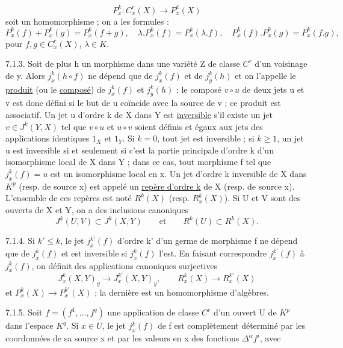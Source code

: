 \[
P_x^k:C_x^r(X)\longrightarrow P_x^k(X)
\]
soit un homomorphisme ; on a les formules :
\[
P_x^k(f)+P_x^k(g)=P_x^k(f+g),\quad
\lambda.P_x^k(f)=P_x^k(\lambda.f),\quad
P_x^k(f).P_x^k(g)=P_x^k(f.g),
\]
pour $f,g\in C_x^r(X)$, $\lambda\in K$.

7.1.3. Soit de plus h un morphisme dans une variété Z de classe $C^r$ d'un voisinage de y. Alors $j_x^k(h\circ f)$ ne dépend que de $j_x^k(f)$ et de $j_y^k(h)$ et on l'appelle le \uline{produit} (ou le \uline{composé}) de $j_x^k(f)$ et $j_y^k(h)$ ; le composé $v\circ u$ de deux jets u et v est donc défini si le but de u coïncide avec la source de v ; ce produit est associatif. Un jet u d'ordre k de X dans Y est \uline{inversible} s'il existe un jet $v\in J^k(Y,X)$ tel que $v\circ u$ et $u\circ v$ soient définis et égaux aux jets des applications identiques $1_X$ et $1_Y$. Si $k=0$, tout jet est inversible ; si $k\geq1$, un jet u est inversible si et seulement si c'est la partie principale d'ordre k d'un isomorphisme local de X dans Y ; dans ce cas, tout morphisme f tel que $j_x^k(f)=u$ est un isomorphisme local en x. Un jet d'ordre k inversible de X dans $K^p$ (resp. de source x) est appelé un \uline{repère d'ordre k} de X (resp. de source x). L'ensemble de ces repères est noté $R^k(X)$ (resp. $R_x^k(X)$). Si U et V sont des ouverts de X et Y, on a des inclusions canoniques
\[
J^k(U,V)\subset J^k(X,Y)\qquad\text{et}\qquad R^k(U)\subset R^k(X).
\]

7.1.4. Si $k'\leq k$, le jet $j_x^{k'}(f)$ d'ordre k' d'un germe de morphisme f ne dépend que de $j_x^k(f)$ et est inversible si $j_x^k(f)$ l'est. En faisant correspondre $j_x^{k'}(f)$ à $j_x^k(f)$, on définit des applications canoniques surjectives
\[
J_x^k(X,Y)_y\longrightarrow J_x^{k'}(X,Y)_y,\qquad
R_x^k(X)\longrightarrow R_x^{k'}(X)
\]
et $P_x^k(X)\longrightarrow P_x^{k'}(X)$ ; la dernière est un homomorphisme d'algèbres.

7.1.5. Soit $f=(f^1,\ldots,f^q)$ une application de classe $C^r$ d'un ouvert U de $K^p$ dans l'espace $K^q$. Si $x\in U$, le jet $j_x^k(f)$ de f est complètement déterminé par les coordonnées de sa source x et par les valeurs en x des fonctions $\Delta^\alpha f^i$, avec
